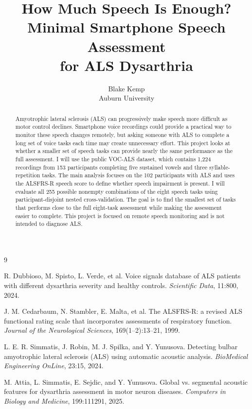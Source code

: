 \documentclass{article}
\title{How Much Speech Is Enough?\\
Minimal Smartphone Speech Assessment\\
for ALS Dysarthria}
\author{%
  Blake Kemp\\
  Auburn University\\
}
\begin{document}
\maketitle

\begin{abstract}
Amyotrophic lateral sclerosis (ALS) can progressively make speech more difficult as motor control declines. Smartphone voice recordings could provide a practical way to monitor these speech changes remotely, but asking someone with ALS to complete a long set of voice tasks each time may create unnecessary effort. This project looks at whether a smaller set of speech tasks can provide nearly the same performance as the full assessment. I will use the public VOC-ALS dataset, which contains 1,224 recordings from 153 participants completing five sustained vowels and three syllable-repetition tasks. The main analysis focuses on the 102 participants with ALS and uses the ALSFRS-R speech score to define whether speech impairment is present. I will evaluate all 255 possible nonempty combinations of the eight speech tasks using participant-disjoint nested cross-validation. The goal is to find the smallest set of tasks that performs close to the full eight-task assessment while making the assessment easier to complete. This project is focused on remote speech monitoring and is not intended to diagnose ALS.
\end{abstract}







\begin{thebibliography}{9}

R. Dubbioso, M. Spisto, L. Verde, et al.
\newblock Voice signals database of ALS patients with different dysarthria severity and healthy controls.
\newblock \textit{Scientific Data}, 11:800, 2024.

J. M. Cedarbaum, N. Stambler, E. Malta, et al.
\newblock The ALSFRS-R: a revised ALS functional rating scale that incorporates assessments of respiratory function.
\newblock \textit{Journal of the Neurological Sciences}, 169(1--2):13--21, 1999.

L. E. R. Simmatis, J. Robin, M. J. Spilka, and Y. Yunusova.
\newblock Detecting bulbar amyotrophic lateral sclerosis (ALS) using automatic acoustic analysis.
\newblock \textit{BioMedical Engineering OnLine}, 23:15, 2024.

M. Attia, L. Simmatis, E. Sejdic, and Y. Yunusova.
\newblock Global vs. segmental acoustic features for dysarthria assessment in motor neuron diseases.
\newblock \textit{Computers in Biology and Medicine}, 199:111291, 2025.

\end{thebibliography}


\end{document}
